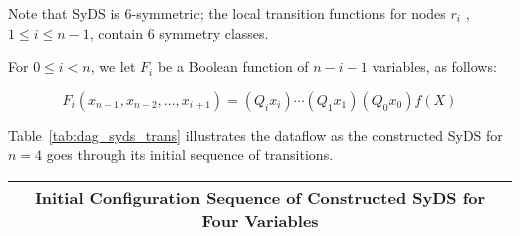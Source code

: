 Note that SyDS \cals{} is 6-symmetric; the local transition functions
for nodes $r_i$ , $1 \leq i \leq n-1$, contain 6 symmetry classes.

For $0 \leq i < n$, we let $F_i$ be a Boolean function of $n-i-1$ variables, 
as follows:

\smallskip
\noindent
$$F_i(x_{n-1}, x_{n-2}, \ldots , x_{i+1}) = (Q_ i x_i) 
\cdots (Q_1 x_1) (Q_0 x_0) f(X)$$

\smallskip

Table~\ref{tab:dag_syds_trans}
illustrates the dataflow as the constructed SyDS \cals{}  
for $n =4$ goes through its initial sequence of transitions.



\begin{table*}
\begin{center}
\begin{tabular}{|l | c c c c c c c c c c c |} \hline
\multicolumn{12}{|c|}{{\bf Initial Configuration Sequence of 
Constructed SyDS for Four Variables}}\\ \hline


\end{tabular}
\end{center}
\end{table*}
